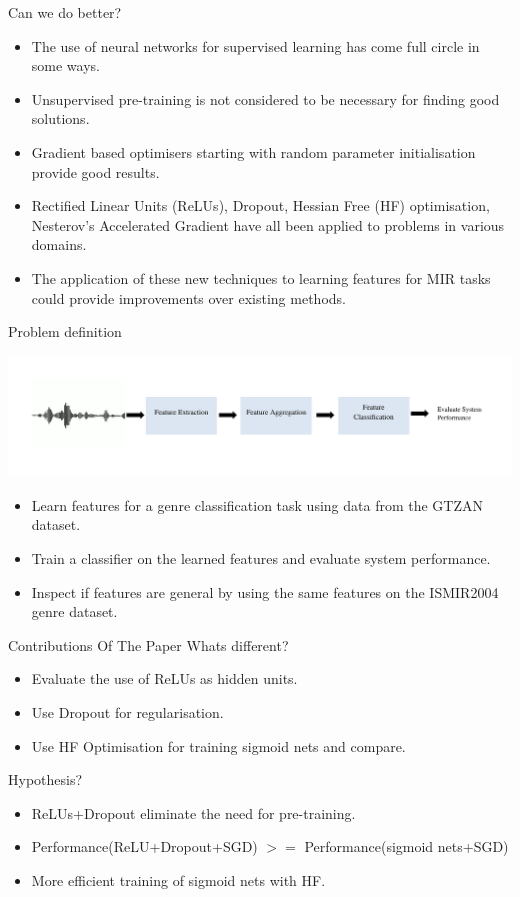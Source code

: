 \documentclass{beamer}
\begin{document}
\begin{frame}{Can we do better?}
  \begin{itemize}
    \item The use of neural networks for supervised learning has come full circle in some ways.
    \item Unsupervised pre-training is not considered to be necessary for finding good solutions. 
    \item Gradient based optimisers starting with random parameter initialisation provide good results. 
    \item Rectified Linear Units (ReLUs), Dropout, Hessian Free (HF) optimisation, Nesterov's Accelerated Gradient have all been applied to problems in various domains.
    \item The application of these new techniques to learning features for MIR tasks could provide improvements over existing methods.  
  \end{itemize}
\end{frame}

\begin{frame}{Problem definition}
  \begin{center}
    \includegraphics[scale=0.4]{Figures/pipeline.pdf}
  \end{center}
  \begin{itemize}
    \item Learn features for a genre classification task using data from the GTZAN dataset.
    \item Train a classifier on the learned features and evaluate system performance.
    \item Inspect if features are general by using the same features on the ISMIR2004 genre dataset. 
  \end{itemize}  
\end{frame}

\begin{frame}{Contributions Of The Paper}
{ Whats different?}
\begin{itemize}
    \item Evaluate the use of ReLUs as hidden units.
    \item Use Dropout for regularisation.
    \item Use HF Optimisation for training sigmoid nets and compare. 
  \end{itemize}
{ Hypothesis?}
\begin{itemize}
    \item ReLUs+Dropout eliminate the need for pre-training.
    \item Performance(ReLU+Dropout+SGD) $>=$ Performance(sigmoid nets+SGD)
    \item More efficient training of sigmoid nets with HF.
  \end{itemize}
\end{frame}
\end{document}
